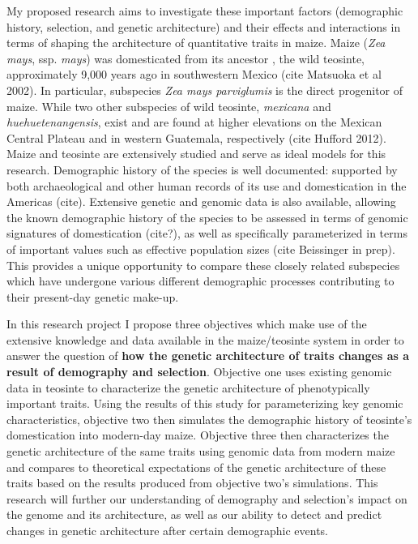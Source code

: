 
My proposed research aims to investigate these important factors (demographic history, selection, and genetic architecture) and their effects and interactions in terms of shaping the architecture of quantitative traits in maize.  Maize (\emph{Zea mays}, ssp. \emph{mays}) was domesticated from its ancestor , the wild teosinte, approximately 9,000 years ago in southwestern Mexico (cite Matsuoka et al 2002). In particular, subspecies \emph{Zea mays parviglumis} is the direct progenitor of maize. While two other subspecies of wild teosinte, \emph{mexicana} and \emph{huehuetenangensis}, exist and are found at higher elevations on the Mexican Central Plateau and in western Guatemala, respectively (cite Hufford 2012). Maize and teosinte are extensively studied and serve as ideal models for this research. Demographic history of the species is well documented: supported by both archaeological and other human records of its use and domestication in the Americas (cite). Extensive genetic and genomic data is also available, allowing the known demographic history of the species to be assessed in terms of genomic signatures of domestication (cite?), as well as specifically parameterized in terms of important values such as effective population sizes (cite Beissinger in prep). This provides a unique opportunity to compare these closely related subspecies which have undergone various different demographic processes contributing to their present-day genetic make-up.

In this research project I propose three objectives which make use of the extensive knowledge and data available in the maize\//teosinte system in order to answer the question of \textbf{how the genetic architecture of traits changes as a result of demography and selection}. Objective one uses existing genomic data in teosinte to characterize the genetic architecture of phenotypically important traits. Using the results of this study for parameterizing key genomic characteristics, objective two then simulates the demographic history of teosinte's domestication into modern-day maize. Objective three then characterizes the genetic architecture of the same traits using genomic data from modern maize and compares to theoretical expectations of the genetic architecture of these traits based on the results produced from objective two's simulations. This research will further our understanding of demography and selection's impact on the genome and its architecture, as well as our ability to detect and predict changes in genetic architecture after certain demographic events.



